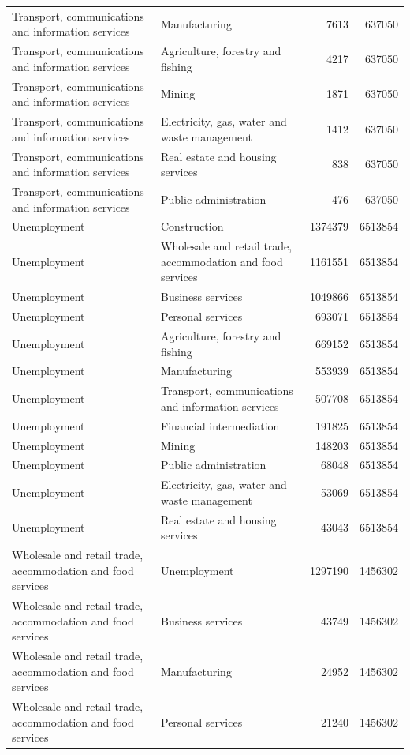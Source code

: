\begin{longtable}{llrr}
Transport, communications and information services & Manufacturing & 7613 & 637050 \\
Transport, communications and information services & Agriculture, forestry and fishing & 4217 & 637050 \\
Transport, communications and information services & Mining & 1871 & 637050 \\
Transport, communications and information services & Electricity, gas, water and waste management & 1412 & 637050 \\
Transport, communications and information services & Real estate and housing services & 838 & 637050 \\
Transport, communications and information services & Public administration & 476 & 637050 \\
Unemployment & Construction & 1374379 & 6513854 \\
Unemployment & Wholesale and retail trade, accommodation and food services & 1161551 & 6513854 \\
Unemployment & Business services & 1049866 & 6513854 \\
Unemployment & Personal services & 693071 & 6513854 \\
Unemployment & Agriculture, forestry and fishing & 669152 & 6513854 \\
Unemployment & Manufacturing & 553939 & 6513854 \\
Unemployment & Transport, communications and information services & 507708 & 6513854 \\
Unemployment & Financial intermediation & 191825 & 6513854 \\
Unemployment & Mining & 148203 & 6513854 \\
Unemployment & Public administration & 68048 & 6513854 \\
Unemployment & Electricity, gas, water and waste management & 53069 & 6513854 \\
Unemployment & Real estate and housing services & 43043 & 6513854 \\
Wholesale and retail trade, accommodation and food services & Unemployment & 1297190 & 1456302 \\
Wholesale and retail trade, accommodation and food services & Business services & 43749 & 1456302 \\
Wholesale and retail trade, accommodation and food services & Manufacturing & 24952 & 1456302 \\
Wholesale and retail trade, accommodation and food services & Personal services & 21240 & 1456302 \\

\end{longtable}
